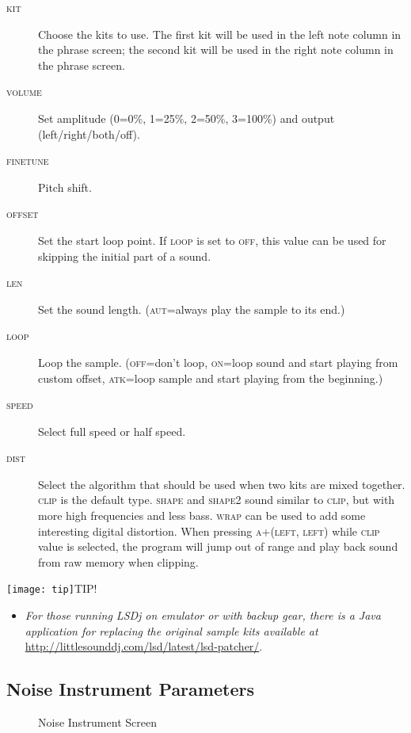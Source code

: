 \begin{description}
	\item[\textsc{kit}] Choose the kits to use. The first kit will be used in the left note column in the phrase screen; the second kit will be used in the right note column in the phrase screen.
    \item[\textsc{volume}] Set amplitude (0=0\%, 1=25\%, 2=50\%, 3=100\%) and output (left/right/both/off).
	\item[\textsc{finetune}] Pitch shift.
	\item[\textsc{offset}] Set the start loop point. If \textsc{loop} is set to \textsc{off}, this value can be used for skipping the initial part of a sound.
	\item[\textsc{len}] Set the sound length. (\textsc{aut}=always play the sample to its end.)
	\item[\textsc{loop}] Loop the sample. (\textsc{off}=don't loop, \textsc{on}=loop sound and start playing from custom offset, \textsc{atk}=loop sample and start playing from the beginning.)
	\item[\textsc{speed}] Select full speed or half speed.
	\item[\textsc{dist}] Select the algorithm that should be used when two kits are mixed together. \textsc{clip} is the default type. \textsc{shape} and \textsc{shape2} sound similar to \textsc{clip}, but with more high frequencies and less bass. \textsc{wrap} can be used to add some interesting digital distortion. When pressing \textsc{a+(left, left)} while \textsc{clip} value is selected, the program will jump out of range and play back sound from raw memory when clipping.
\end{description}

\texttt{[image: tip]}TIP!
\begin{itemize}
	\item \textit{For those running LSDj on emulator or with backup gear, there is a Java application for replacing the original sample kits available at} \url{http://littlesounddj.com/lsd/latest/lsd-patcher/}.
\end{itemize}

\subsection{Noise Instrument Parameters}
\label{noise-instrument-parameters}

\begin{figure}[htpb]
	\begin{center}
	\end{center}
	\caption{Noise Instrument Screen}
	\label{fig:instr-noise}
\end{figure}

